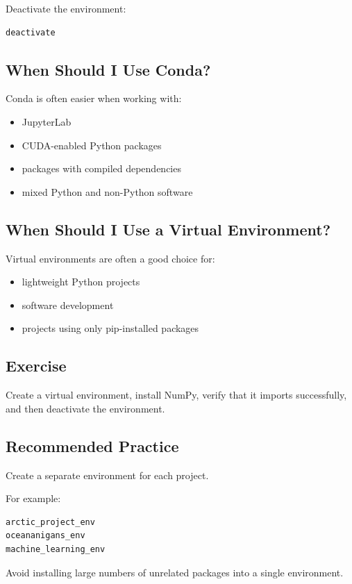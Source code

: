 Deactivate the environment:

\begin{lstlisting}
deactivate
\end{lstlisting}

\subsection{When Should I Use Conda?}

Conda is often easier when working with:

\begin{itemize}
\item JupyterLab
\item CUDA-enabled Python packages
\item packages with compiled dependencies
\item mixed Python and non-Python software
\end{itemize}

\subsection{When Should I Use a Virtual Environment?}

Virtual environments are often a good choice for:

\begin{itemize}
\item lightweight Python projects
\item software development
\item projects using only pip-installed packages
\end{itemize}

\subsection{Exercise}

Create a virtual environment, install NumPy, verify that it imports successfully, and then deactivate the environment.

\subsection{Recommended Practice}

Create a separate environment for each project.

For example:

\begin{lstlisting}
arctic_project_env
oceananigans_env
machine_learning_env
\end{lstlisting}

Avoid installing large numbers of unrelated packages into a single environment.